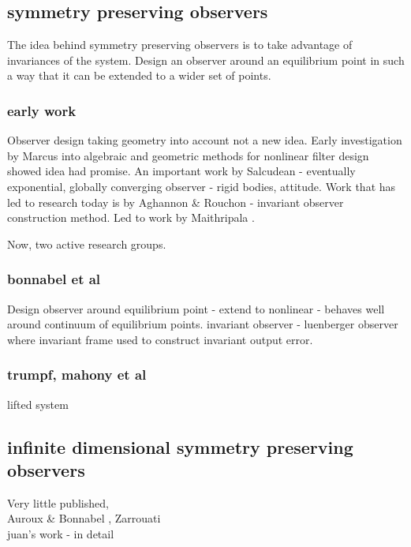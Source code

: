 \subsection{symmetry preserving observers}
The idea behind symmetry preserving observers is to take advantage of invariances of the system. Design an observer around an equilibrium point in such a way that it can be extended to a wider set of points.

\subsubsection{early work}
Observer design taking geometry into account not a new idea. Early investigation by Marcus \cite{marcus1984algebraic} into algebraic and geometric methods for nonlinear filter design showed idea had promise.
An important work by Salcudean - eventually exponential, globally converging observer - rigid bodies, attitude.
Work that has led to research today is by Aghannon \& Rouchon \cite{aghannan2002invariant} - invariant observer construction method.
Led to work by Maithripala \cite{maithripala2005intrinsic}. 

Now, two active research groups.
\subsubsection{bonnabel et al}
Design observer around equilibrium point - extend to nonlinear - behaves well around continuum of equilibrium points.
invariant observer - luenberger observer where invariant frame used to construct invariant output error.
\subsubsection{trumpf, mahony et al}
lifted system

\subsection{infinite dimensional symmetry preserving observers}
Very little published,\\
Auroux \& Bonnabel \cite{auroux2011symmetry}, Zarrouati \cite{zarrouati2013augmented} \\
juan's work \cite{adarvefiltering} - in detail

